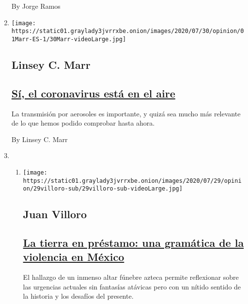\begin{enumerate}
  By Jorge Ramos
\item
  \texttt{[image: https://static01.graylady3jvrrxbe.onion/images/2020/07/30/opinion/01Marr-ES-1/30Marr-videoLarge.jpg]}

  \hypertarget{linsey-c-marr}{%
  \subsection{Linsey C. Marr}\label{linsey-c-marr}}

  \hypertarget{suxed-el-coronavirus-estuxe1-en-el-aire}{%
  \subsection{\texorpdfstring{\href{/es/2020/08/01/espanol/opinion/coronavirus-aire.html}{Sí,
  el coronavirus está en el
  aire}}{Sí, el coronavirus está en el aire}}\label{suxed-el-coronavirus-estuxe1-en-el-aire}}

  La transmisión por aerosoles es importante, y quizá sea mucho más
  relevante de lo que hemos podido comprobar hasta ahora.

  By Linsey C. Marr
\item
  \begin{enumerate}
  \def\labelenumii{\arabic{enumii}.}
  \item
    \texttt{[image: https://static01.graylady3jvrrxbe.onion/images/2020/07/29/opinion/29villoro-sub/29villoro-sub-videoLarge.jpg]}

    \hypertarget{juan-villoro}{%
    \subsection{Juan Villoro}\label{juan-villoro}}

    \hypertarget{la-tierra-en-pruxe9stamo-una-gramuxe1tica-de-la-violencia-en-muxe9xico}{%
    \subsection{\texorpdfstring{\href{/es/2020/07/30/espanol/opinion/aztecas-violencia-narco-amlo.html}{La
    tierra en préstamo: una gramática de la violencia en
    México}}{La tierra en préstamo: una gramática de la violencia en México}}\label{la-tierra-en-pruxe9stamo-una-gramuxe1tica-de-la-violencia-en-muxe9xico}}

    El hallazgo de un inmenso altar fúnebre azteca permite reflexionar
    sobre las urgencias actuales sin fantasías atávicas pero con un
    nítido sentido de la historia y los desafíos del presente.


\end{enumerate}
\end{enumerate}
